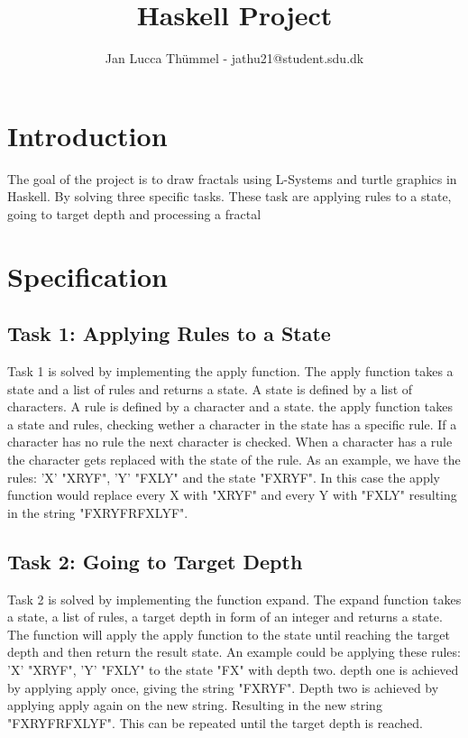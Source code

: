 \documentclass{article}
\title{Haskell Project}
\author{Jan Lucca Thümmel - jathu21@student.sdu.dk}
\begin{document}
\maketitle


\tableofcontents

\newpage

\section{Introduction}
The goal of the project is to draw fractals using L-Systems and turtle graphics in Haskell. By solving three specific tasks. These task are applying rules to a state, going to target depth and processing a fractal

\section{Specification}

\subsection{Task 1: Applying Rules to a State}
Task 1 is solved by implementing the apply function. The apply function takes a state and a list of rules and returns a state. A state is defined by a list of characters. A rule is defined by a character and a state. the apply function takes a state and rules, checking wether a character in the state has a specific rule. If a character has no rule the next character is checked. When a character has a rule the character gets replaced with the state of the rule. As an example, we have the rules: ’X’ "XRYF", ’Y’ "FXLY" and the state "FXRYF". In this case the apply function would replace every X with "XRYF" and every Y with "FXLY" resulting in the string "FXRYFRFXLYF".

\subsection{Task 2: Going to Target Depth}
Task 2 is solved by implementing the function expand. The expand function takes a state, a list of rules, a target depth in form of an integer and returns a state. The function will apply the apply function to the state until reaching the target depth and then return the result state. An example could be applying these rules: ’X’ "XRYF", ’Y’ "FXLY" to the state "FX" with depth two. depth one is achieved by applying apply once, giving the string "FXRYF". Depth two is achieved by applying apply again on the new string. Resulting in the new string "FXRYFRFXLYF". This can be repeated until the target depth is reached.
\end{document}

